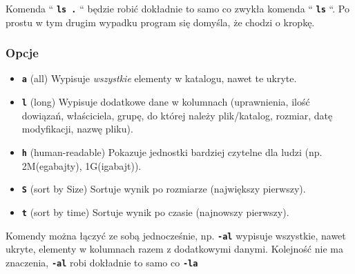 \documentclass[12pt]{article}
\newcommand{\ttbf}[1]{
    \texttt{\textbf{#1}}
}
\begin{document}
Komenda ``\ttbf{ls .}`` będzie robić dokładnie to samo co zwykła komenda ``\ttbf{ls}``. Po prostu w tym drugim wypadku program się domyśla, że chodzi o kropkę.

\subsubsection{Opcje}
\begin{itemize}
    \item \ttbf{a} (all) Wypisuje \emph{wszystkie} elementy w katalogu, nawet te ukryte.
    \item \ttbf{l} (long) Wypisuje dodatkowe dane w kolumnach (uprawnienia, ilość dowiązań, właściciela, grupę, do której należy plik/katalog, rozmiar, datę modyfikacji, nazwę pliku).
    \item \ttbf{h} (human-readable) Pokazuje jednostki bardziej czytelne dla ludzi (np. 2M(egabajty), 1G(igabajt)).
    \item \ttbf{S} (sort by Size) Sortuje wynik po rozmiarze (największy pierwszy).
    \item \ttbf{t} (sort by time) Sortuje wynik po czasie (najnowszy pierwszy).
\end{itemize}

Komendy można łączyć ze sobą jednocześnie, np. \ttbf{-al} wypisuje wszystkie, nawet ukryte, elementy w kolumnach razem z dodatkowymi danymi. Kolejność nie ma znaczenia, \ttbf{-al} robi dokładnie to samo co \ttbf{-la}
\end{document}
